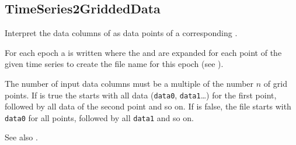 \clearpage
\subsection{TimeSeries2GriddedData}\label{TimeSeries2GriddedData}
Interpret the data columns of 
as data points of a corresponding .

For each epoch a  is written where
the  and  are expanded for
each point of the given time series to create the file name for this epoch
(see ).

The number of input data columns must be a multiple of the number $n$ of grid points.
If  is true the  starts
with all data (\verb|data0|, \verb|data1|\ldots) for the first point, followed by all data of the second point and so on.
If  is false, the file starts with \verb|data0| for all points, followed by all \verb|data1| and so on.

See also .


